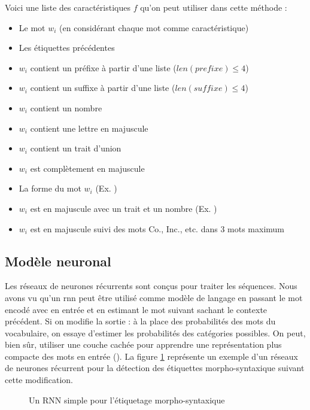 \documentclass{KodeBook}
\begin{document}
Voici une liste des caractéristiques $f$ qu'on peut utiliser dans cette méthode :
\begin{itemize}
	\item Le mot $w_i$ (en considérant chaque mot comme caractéristique)
	\item Les étiquettes précédentes 
	\item $w_i$ contient un préfixe à partir d'une liste ($len(prefixe) \le 4$) 
	\item $w_i$ contient un suffixe à partir d'une liste ($len(suffixe) \le 4$) 
	\item $w_i$ contient un nombre 
	\item $w_i$ contient une lettre en majuscule
	\item $w_i$ contient un trait d'union 
	\item $w_i$ est complètement en majuscule
	\item La forme du mot $w_i$ (Ex. ) 
	\item $w_i$ est en majuscule avec un trait et un nombre (Ex. ) 
	\item $w_i$ est en majuscule suivi des mots Co., Inc., etc. dans 3 mots maximum
\end{itemize}

\subsection{Modèle neuronal}

Les réseaux de neurones récurrents sont conçus pour traiter les séquences.
Nous avons vu qu'un \ac{rnn} peut être utilisé comme modèle de langage en passant le mot encodé avec  en entrée et en estimant le mot suivant sachant le contexte précédent. 
Si on modifie la  sortie : à la place des probabilités des mots du vocabulaire, on essaye d'estimer les probabilités des catégories possibles. 
On peut, bien sûr, utiliser une couche cachée pour apprendre une représentation plus compacte des mots en entrée (). 
La figure \ref{fig:pos-rnn1} représente un exemple d'un réseaux de neurones récurrent pour la détection des étiquettes morpho-syntaxique suivant cette modification.
\begin{figure}[ht]
	\centering
	\caption[Un RNN simple pour l'étiquetage morpho-syntaxique]{Un RNN simple pour l'étiquetage morpho-syntaxique \cite{2019-jurafsky-martin}\label{fig:pos-rnn1}}
\end{figure}
\end{document}
